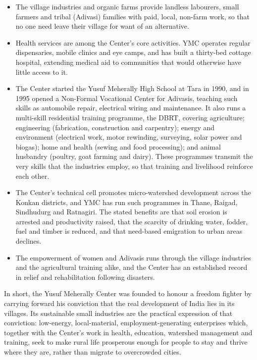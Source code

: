 \documentclass[a4paper, 11pt]{article}
\begin{document}
		\begin{itemize}
			
			\item {} The village industries and organic farms provide landless labourers, small farmers and tribal (Adivasi) families with paid, local, non-farm work, so that no one need leave their village for want of an alternative.
			
			\item {} Health services are among the Center's core activities. YMC operates regular dispensaries, mobile clinics and eye camps, and has built a thirty-bed cottage hospital, extending medical aid to communities that would otherwise have little access to it.
			
			\item {} The Center started the Yusuf Meherally High School at Tara in 1990, and in 1995 opened a Non-Formal Vocational Center for Adivasis, teaching such skills as automobile repair, electrical wiring and maintenance. It also runs a multi-skill residential training programme, the DBRT, covering agriculture; engineering (fabrication, construction and carpentry); energy and environment (electrical work, motor rewinding, surveying, solar power and biogas); home and health (sewing and food processing); and animal husbandry (poultry, goat farming and dairy). These programmes transmit the very skills that the industries employ, so that training and livelihood reinforce each other.
			
			\item {} The Center's technical cell promotes micro-watershed development across the Konkan districts, and YMC has run such programmes in Thane, Raigad, Sindhudurg and Ratnagiri. The stated benefits are that soil erosion is arrested and productivity raised, that the scarcity of drinking water, fodder, fuel and timber is reduced, and that need-based emigration to urban areas declines.
			
			\item {} The empowerment of women and Adivasis runs through the village industries and the agricultural training alike, and the Center has an established record in relief and rehabilitation following disasters.
			
		\end{itemize}
		
		In short, the Yusuf Meherally Center was founded to honour a freedom fighter by carrying forward his conviction that the real development of India lies in its villages. Its sustainable small industries are the practical expression of that conviction: low-energy, local-material, employment-generating enterprises which, together with the Center's work in health, education, watershed management and training, seek to make rural life prosperous enough for people to stay and thrive where they are, rather than migrate to overcrowded cities.
		
\end{document}
